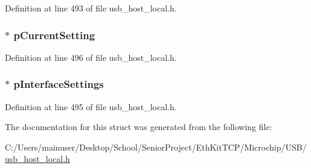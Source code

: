 Definition at line 493 of file usb\+\_\+host\+\_\+local.\+h.

\hypertarget{struct___u_s_b___i_n_t_e_r_f_a_c_e___i_n_f_o_ab3000e39cccff71edc370a0dc8862776}{}
\subsubsection[{p\+Current\+Setting}]{$\ast$ p\+Current\+Setting}\label{struct___u_s_b___i_n_t_e_r_f_a_c_e___i_n_f_o_ab3000e39cccff71edc370a0dc8862776}


Definition at line 496 of file usb\+\_\+host\+\_\+local.\+h.

\hypertarget{struct___u_s_b___i_n_t_e_r_f_a_c_e___i_n_f_o_a12794164365e1fd1fb8e87d6e5365732}{}
\subsubsection[{p\+Interface\+Settings}]{$\ast$ p\+Interface\+Settings}\label{struct___u_s_b___i_n_t_e_r_f_a_c_e___i_n_f_o_a12794164365e1fd1fb8e87d6e5365732}


Definition at line 495 of file usb\+\_\+host\+\_\+local.\+h.



The documentation for this struct was generated from the following file\+:\begin{DoxyCompactItemize}
\item 
C\+:/\+Users/mainuser/\+Desktop/\+School/\+Senior\+Project/\+Eth\+Kit\+T\+C\+P/\+Microchip/\+U\+S\+B/\hyperlink{usb__host__local_8h}{usb\+\_\+host\+\_\+local.\+h}\end{DoxyCompactItemize}
